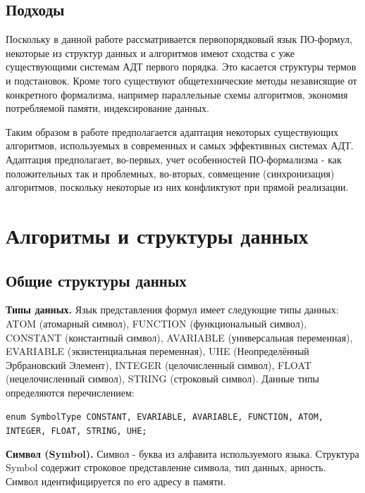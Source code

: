 \subsection{Подходы}
Поскольку в данной работе рассматривается первопорядковый язык ПО-формул, некоторые из структур данных и алгоритмов имеют сходства с уже существующими системам АДТ первого порядка. Это касается структуры термов и подстановок. Кроме того существуют общетехнические методы независящие от конкретного формализма, например параллельные схемы алгоритмов, экономия потребляемой памяти, индексирование данных.

Таким образом в работе предполагается адаптация некоторых существующих алгоритмов, используемых в современных и самых эффективных системах АДТ. Адаптация предполагает, во-первых, учет особенностей ПО-формализма - как положительных так и проблемных, во-вторых, совмещение (синхронизация) алгоритмов, поскольку некоторые из них конфликтуют при прямой реализации.



\section{Алгоритмы и структуры данных}

\subsection{Общие структуры данных}

\textbf{Типы данных.} Язык представления формул имеет следующие типы данных: ATOM (атомарный символ), FUNCTION (функциональный символ), CONSTANT (константный символ), AVARIABLE (универсальная переменная), EVARIABLE (экзистенциальная переменная), UHE (Неопределённый Эрбрановский Элемент), INTEGER (целочисленный символ), FLOAT (нецелочисленный символ), STRING (строковый символ). Данные типы определяются перечислением:

{\tt enum SymbolType {CONSTANT, EVARIABLE, AVARIABLE, FUNCTION, ATOM, INTEGER, FLOAT, STRING, UHE};}


\textbf{Символ (Symbol).} Символ - буква из алфавита используемого языка. Структура Symbol содержит строковое представление символа, тип данных, арность. Символ идентифицируется по его адресу в памяти.

